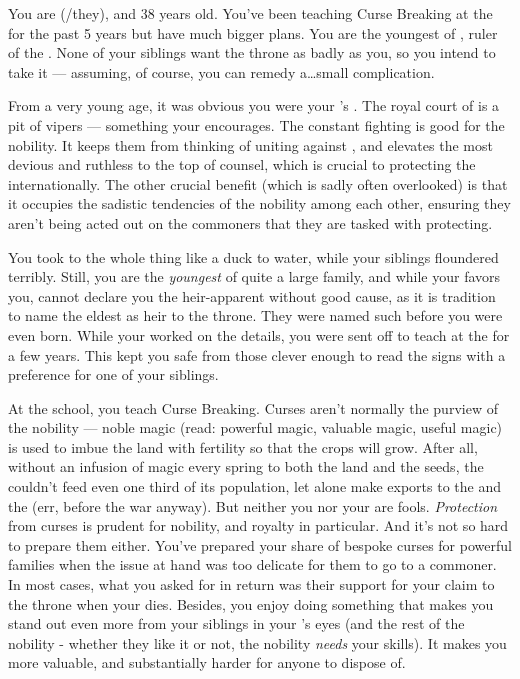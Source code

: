 \documentclass[char]{GL2020}
\begin{document}
\name{\cPrince{}}

You are \cPrince{\full} (\cPrince{\they}/they), and 38 years old. You've been teaching Curse Breaking at the \pSchool{} for the past 5 years but have much bigger plans. You are the youngest \cPrince{\offspring} of \cQueen{\full}, ruler of the \pFarm{}. None of your siblings want the throne as badly as you, so you intend to take it — assuming, of course, you can remedy a\ldots{}small complication.

From a very young age, it was obvious you were your \cQueen{\parent}'s \cPrince{\offspring}. The royal court of \pFarm{} is a pit of vipers — something your \cQueen{\parent} encourages. The constant fighting is good for the nobility. It keeps them from thinking of uniting against \cQueen{\them}, and elevates the most devious and ruthless to the top of \cQueen{\their} counsel, which is crucial to protecting the \pFarm{} internationally. The other crucial benefit (which is sadly often overlooked) is that it occupies the sadistic tendencies of the nobility among each other, ensuring they aren’t being acted out on the commoners that they are tasked with protecting. 

You took to the whole thing like a duck to water, while your siblings floundered terribly. Still, you are the \emph{youngest} of quite a large family, and while your \cQueen{\parent} favors you, \cQueen{\they} cannot declare you the heir-apparent without good cause, as it is tradition to name the eldest as heir to the throne. They were named such before you were even born.  While your \cQueen{\parent} worked on the details, you were sent off to teach at the \pSchool{} for a few years. This kept you safe from those clever enough to read the signs with a preference for one of your siblings.

At the school, you teach Curse Breaking. Curses aren't normally the purview of the nobility — noble magic (read: powerful magic, valuable magic, useful magic) is used to imbue the land with fertility so that the crops will grow. After all, without an infusion of magic every spring to both the land and the seeds, the \pFarm{} couldn't feed even one third of its population, let alone make exports to the \pTech{} and the \pShip{} (err, before the war anyway). But neither you nor your \cQueen{\parent} are fools. \emph{Protection} from curses is prudent for nobility, and royalty in particular. And it's not so hard to prepare them either. You've prepared your share of bespoke curses for powerful families when the issue at hand was too delicate for them to go to a commoner. In most cases, what you asked for in return was their support for your claim to the throne when your \cQueen{\parent} dies. Besides, you enjoy doing something that makes you stand out even more from your siblings in your \cQueen{\parent}’s eyes (and the rest of the nobility - whether they like it or not, the nobility \emph{needs} your skills).  It makes you more valuable, and substantially harder for anyone to dispose of.
\end{document}
